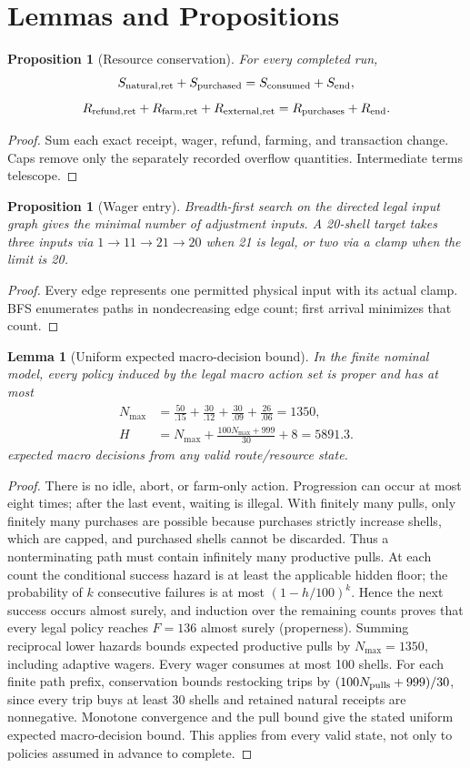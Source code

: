 \documentclass[11pt]{article}
\newtheorem{lemma}[theorem]{Lemma}
\newtheorem{proposition}[theorem]{Proposition}
\theoremstyle{definition}\newtheorem{definition}[theorem]{Definition}
\begin{document}
\section{Lemmas and Propositions}
\begin{proposition}[Resource conservation]
For every completed run,
\[
 S_{\rm natural,ret}+S_{\rm purchased}=S_{\rm consumed}+S_{\rm end},
\]
\[
 R_{\rm refund,ret}+R_{\rm farm,ret}+R_{\rm external,ret}
 =R_{\rm purchases}+R_{\rm end}.
\]
\end{proposition}
\begin{proof}
Sum each exact receipt, wager, refund, farming, and transaction change. Caps remove only the separately recorded overflow quantities. Intermediate terms telescope.
\end{proof}
\begin{proposition}[Wager entry]
Breadth-first search on the directed legal input graph gives the minimal number of adjustment inputs. A 20-shell target takes three inputs via $1\to11\to21\to20$ when 21 is legal, or two via a clamp when the limit is 20.
\end{proposition}
\begin{proof}
Every edge represents one permitted physical input with its actual clamp. BFS enumerates paths in nondecreasing edge count; first arrival minimizes that count.
\end{proof}
\begin{lemma}[Uniform expected macro-decision bound]
In the finite nominal model, every policy induced by the legal macro action set is proper and has at most
\[
 \begin{aligned}N_{\max}&=\frac{50}{.15}+\frac{30}{.12}+\frac{30}{.09}+\frac{26}{.06}=1350,\\
 H&=N_{\max}+\frac{100N_{\max}+999}{30}+8=5891.3.\end{aligned}
\]
expected macro decisions from any valid route/resource state.
\end{lemma}
\begin{proof}
There is no idle, abort, or farm-only action. Progression can occur at most eight times; after the last event, waiting is illegal. With finitely many pulls, only finitely many purchases are possible because purchases strictly increase shells, which are capped, and purchased shells cannot be discarded. Thus a nonterminating path must contain infinitely many productive pulls. At each count the conditional success hazard is at least the applicable hidden floor; the probability of $k$ consecutive failures is at most $(1-h/100)^k$. Hence the next success occurs almost surely, and induction over the remaining counts proves that every legal policy reaches $F=136$ almost surely (properness).
Summing reciprocal lower hazards bounds expected productive pulls by $N_{\max}=1350$, including adaptive wagers. Every wager consumes at most 100 shells. For each finite path prefix, conservation bounds restocking trips by $(100N_{\rm pulls}+999)/30$, since every trip buys at least 30 shells and retained natural receipts are nonnegative. Monotone convergence and the pull bound give the stated uniform expected macro-decision bound. This applies from every valid state, not only to policies assumed in advance to complete.
\end{proof}
\end{document}
